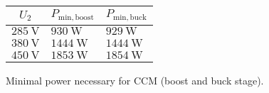 \begin{solutiontable}[htb]
    \centering  %
    \begin{tabular}{lll}
        \toprule
        \multicolumn{1}{c}{$U_\mathrm{2}$} & \multicolumn{1}{c}{$P_\mathrm{min,boost}$} 
        & \multicolumn{1}{c}{$P_\mathrm{min,buck}$} \\
        \midrule 
        $\SI{285}{\volt}$ & $\SI{930}{\watt}$ & $\SI{929}{\watt}$\\ 
        $\SI{380}{\volt}$ & $\SI{1444}{\watt}$ & $\SI{1444}{\watt}$ \\ 
        $\SI{450}{\volt}$ & $\SI{1853}{\watt}$ & $\SI{1854}{\watt}$\\ 
        \bottomrule
    \end{tabular}
    \caption{Minimal power necessary for CCM (boost and buck stage).}
    \label{table:PowerminInputOutputStage}
\end{solutiontable}

